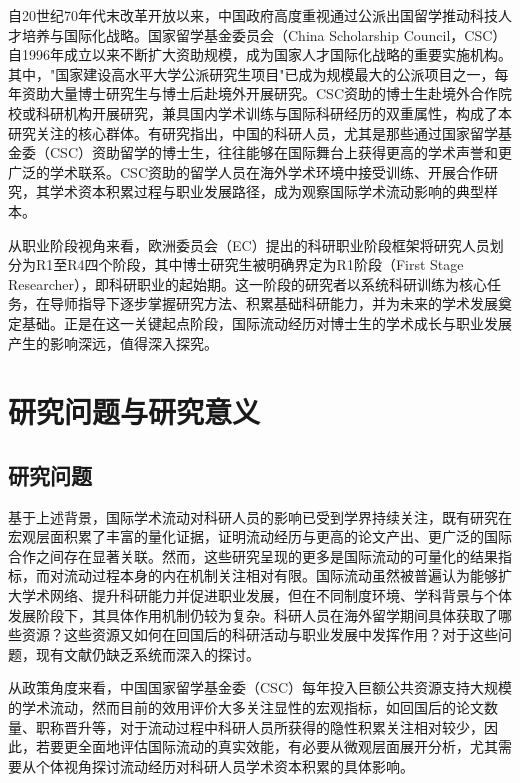 自20世纪70年代末改革开放以来，中国政府高度重视通过公派出国留学推动科技人才培养与国际化战略。国家留学基金委员会（China Scholarship Council，CSC）自1996年成立以来\cite{csc_about}不断扩大资助规模，成为国家人才国际化战略的重要实施机构。其中，"国家建设高水平大学公派研究生项目"已成为规模最大的公派项目之一，每年资助大量博士研究生与博士后赴境外开展研究\cite{csc_2026guide}。CSC资助的博士生赴境外合作院校或科研机构开展研究，兼具国内学术训练与国际科研经历的双重属性，构成了本研究关注的核心群体。有研究指出，中国的科研人员，尤其是那些通过国家留学基金委（CSC）资助留学的博士生，往往能够在国际舞台上获得更高的学术声誉和更广泛的学术联系\cite{jianghua2023}。CSC资助的留学人员在海外学术环境中接受训练、开展合作研究，其学术资本积累过程与职业发展路径，成为观察国际学术流动影响的典型样本。

从职业阶段视角来看，欧洲委员会（EC）提出的科研职业阶段框架将研究人员划分为R1至R4四个阶段，其中博士研究生被明确界定为R1阶段（First Stage Researcher），即科研职业的起始期。这一阶段的研究者以系统科研训练为核心任务，在导师指导下逐步掌握研究方法、积累基础科研能力，并为未来的学术发展奠定基础。正是在这一关键起点阶段，国际流动经历对博士生的学术成长与职业发展产生的影响深远，值得深入探究。

\section{研究问题与研究意义}

\subsection{研究问题}

基于上述背景，国际学术流动对科研人员的影响已受到学界持续关注，既有研究在宏观层面积累了丰富的量化证据，证明流动经历与更高的论文产出、更广泛的国际合作之间存在显著关联。然而，这些研究呈现的更多是国际流动的可量化的结果指标，而对流动过程本身的内在机制关注相对有限。国际流动虽然被普遍认为能够扩大学术网络、提升科研能力并促进职业发展，但在不同制度环境、学科背景与个体发展阶段下，其具体作用机制仍较为复杂。科研人员在海外留学期间具体获取了哪些资源？这些资源又如何在回国后的科研活动与职业发展中发挥作用？对于这些问题，现有文献仍缺乏系统而深入的探讨。

从政策角度来看，中国国家留学基金委（CSC）每年投入巨额公共资源支持大规模的学术流动，然而目前的效用评价大多关注显性的宏观指标，如回国后的论文数量、职称晋升等，对于流动过程中科研人员所获得的隐性积累关注相对较少，因此，若要更全面地评估国际流动的真实效能，有必要从微观层面展开分析，尤其需要从个体视角探讨流动经历对科研人员学术资本积累的具体影响。

